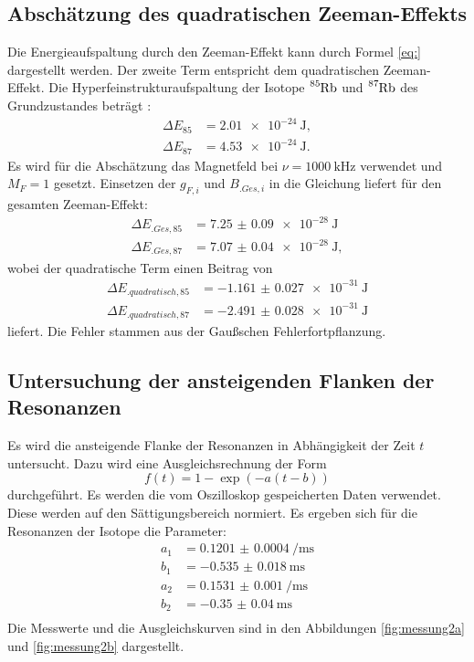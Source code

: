 \subsection{Abschätzung des quadratischen Zeeman-Effekts}

Die Energieaufspaltung durch den Zeeman-Effekt kann durch Formel \eqref{eq:} dargestellt werden. 
Der zweite Term entspricht dem quadratischen Zeeman-Effekt. Die Hyperfeinstrukturaufspaltung der Isotope $\ce{^{85}Rb}$ und $\ce{^{87}Rb}$ des Grundzustandes beträgt \cite{V21}:
\begin{align*}
\Delta E_{85} &= \SI{2.01e-24}{\joule},\\
\Delta E_{87} &= \SI{4.53e-24}{\joule}\text{.}
\end{align*}
Es wird für die Abschätzung das Magnetfeld bei $\nu=\SI{1000}{\kilo\hertz}$ verwendet und $M_F=1$ gesetzt. Einsetzen der $g_{F,i}$ und $B_{.{Ges},i}$ in die Gleichung liefert für den gesamten Zeeman-Effekt:
\begin{align*}
\Delta E_{.{Ges},85} &= \SI{7.25(9)e-28}{\joule}\\
\Delta E_{.{Ges},87} &= \SI{7.07(4)e-28}{\joule},
\end{align*}
wobei der quadratische Term einen Beitrag von
\begin{align*}
\Delta E_{.{quadratisch},85} &= \SI{-1.161(27)e-31}{\joule}\\
\Delta E_{.{quadratisch},87} &= \SI{-2.491(28)e-31}{\joule}
\end{align*}
liefert. Die Fehler stammen aus der Gaußschen Fehlerfortpflanzung.

\subsection{Untersuchung der ansteigenden Flanken der Resonanzen}

Es wird die ansteigende Flanke der Resonanzen in Abhängigkeit der Zeit $t$ untersucht. Dazu wird eine Ausgleichsrechnung der Form
\[
f(t)=1-\exp(-a(t-b))
\]
durchgeführt. Es werden die vom Oszilloskop gespeicherten Daten verwendet. Diese werden auf den Sättigungsbereich normiert.
Es ergeben sich für die Resonanzen der Isotope die Parameter:
\begin{align*}
a_1 &= \SI{0.1201(4)}{\per\milli\second}\\
b_1 &= \SI{-0.535(18)}{\milli\second}\\
a_2 &= \SI{0.1531(10)}{\per\milli\second}\\
b_2 &= \SI{-0.35(4)}{\milli\second}\\
\end{align*}
Die Messwerte und die Ausgleichskurven sind in den Abbildungen \ref{fig:messung2a} und \ref{fig:messung2b} dargestellt. 

